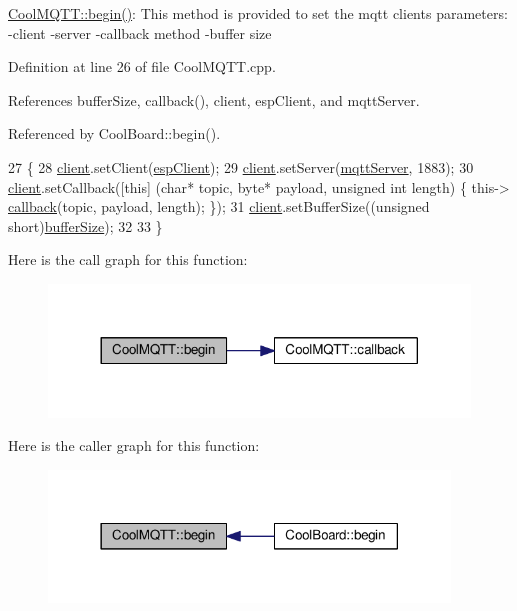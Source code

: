 \hyperlink{classCoolMQTT_ac9248808641ebf3054ed0620ea9d0100}{Cool\+M\+Q\+T\+T\+::begin()}\+: This method is provided to set the mqtt client\textquotesingle{}s parameters\+: -\/client -\/server -\/callback method -\/buffer size 

Definition at line 26 of file Cool\+M\+Q\+T\+T.\+cpp.



References buffer\+Size, callback(), client, esp\+Client, and mqtt\+Server.



Referenced by Cool\+Board\+::begin().


\begin{DoxyCode}
27 \{ 
28     \hyperlink{classCoolMQTT_a4ca71e4f76ef868692a297efd45b1415}{client}.setClient(\hyperlink{classCoolMQTT_acc30a0200967374a524092a8a806502a}{espClient});
29     \hyperlink{classCoolMQTT_a4ca71e4f76ef868692a297efd45b1415}{client}.setServer(\hyperlink{classCoolMQTT_ab8bb951f87ddbf92db74c2ad16a3e53e}{mqttServer}, 1883); 
30     \hyperlink{classCoolMQTT_a4ca71e4f76ef868692a297efd45b1415}{client}.setCallback([\textcolor{keyword}{this}] (\textcolor{keywordtype}{char}* topic, byte* payload, \textcolor{keywordtype}{unsigned} \textcolor{keywordtype}{int} length) \{ this->
      \hyperlink{classCoolMQTT_a30d82ad665bfb603f46ecdbc290775df}{callback}(topic, payload, length); \});
31     \hyperlink{classCoolMQTT_a4ca71e4f76ef868692a297efd45b1415}{client}.setBufferSize((\textcolor{keywordtype}{unsigned} \textcolor{keywordtype}{short})\hyperlink{classCoolMQTT_a7f3cf26b51d6770f216e42c5ef13ca9f}{bufferSize});
32 
33 \}
\end{DoxyCode}
Here is the call graph for this function\+:
\nopagebreak
\begin{figure}[H]
\begin{center}
\leavevmode
\includegraphics[width=317pt]{classCoolMQTT_ac9248808641ebf3054ed0620ea9d0100_cgraph}
\end{center}
\end{figure}
Here is the caller graph for this function\+:
\nopagebreak
\begin{figure}[H]
\begin{center}
\leavevmode
\includegraphics[width=302pt]{classCoolMQTT_ac9248808641ebf3054ed0620ea9d0100_icgraph}
\end{center}
\end{figure}
